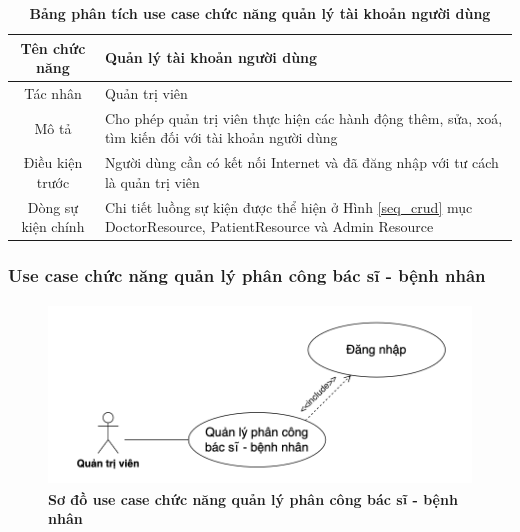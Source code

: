   \begin{table}[H]
    \caption{\bfseries \fontsize{12pt}{0pt}\selectfont Bảng phân tích use case chức năng quản lý tài khoản người dùng}
    \centering
    \begin{tabularx}{0.9\textwidth}{|c|X|}
      \hline
      \textbf{Tên chức năng} & \textbf{Quản lý tài khoản người dùng} \\
      \hline
      Tác nhân & Quản trị viên \\
      \hline
      Mô tả & Cho phép quản trị viên thực hiện các hành động thêm, sửa, xoá, tìm kiến đối với tài khoản người dùng \\
      \hline
      Điều kiện trước & Người dùng cần có kết nối Internet và đã đăng nhập với tư cách là quản trị viên \\
      \hline
      Dòng sự kiện chính & 
        Chi tiết luồng sự kiện được thể hiện ở Hình \ref{seq_crud} mục DoctorResource, PatientResource và Admin Resource\\
      \hline
    \end{tabularx}
  \end{table}

\subsubsection{Use case chức năng quản lý phân công bác sĩ - bệnh nhân}
  \begin{figure}[H]
    \centering
    \includegraphics[width=12cm,height=4.8cm]{Images/use_case/use_case_assign_doctor.png}
    \caption[Sơ đồ use case chức năng quản lý phân công bác sĩ - bệnh nhân]{\bfseries \fontsize{12pt}{0pt}
    \selectfont Sơ đồ use case chức năng quản lý phân công bác sĩ - bệnh nhân}
    \label{use_case_assign_doctor} %
  \end{figure}

